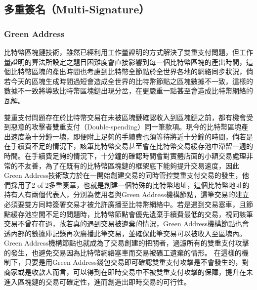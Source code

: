 		\subsection{多重簽名（Multi-Signature）}
		 	\subsubsection{Green Address}
		 	比特幣區塊鏈技術，雖然已經利用工作量證明的方式解決了雙重支付問題，但工作量證明的算法所設定之題目困難度會直接影響到每一個比特幣區塊的產出時間，這個比特幣區塊的產出時間也考慮到比特幣全節點於全世界各地的網絡同步狀況，倘若今天的區塊生成時間過短會造成全世界的比特幣節點之區塊數據不一致，這樣的數據不一致將導致比特幣區塊鏈出現分岔，在更嚴重一點甚至會造成比特幣網絡的瓦解。

		 	雙重支付問題存在於比特幣交易在未被區塊鏈確認收入到區塊鏈之前，都有機會受到惡意的攻擊者雙重支付（Double-spending）\supercite{Informationpropagationinthebitcoinnetwork}同一筆款項。現今的比特幣區塊產出速度為十分鐘一塊，即便附上足夠的手續費也須等待將近十分鐘的時間，倘若是在手續費不足的情況下，該筆比特幣交易甚至會在比特幣交易緩存池中滯留一週的時間。在手續費足夠的情況下，十分鐘的確認時間會對實體店面的小額交易處理非常的不友善，為了在既有的比特幣區塊鏈的框架底下能夠提升交易速度，因此Green Address技術致力於在一開始創建交易的同時管控雙重支付交易的發生，他們採用了2-of-2多重簽章，也就是創建一個特殊的比特幣地址，這個比特幣地址的持有人有兩個代表人，分別為使用者與Green Address機構節點，這筆交易的建立必須要雙方同時簽署交易才被允許廣播至比特幣網絡中。若是遇到交易塞車，且節點緩存池空間不足的問題時，比特幣節點會優先遺棄手續費最低的交易，視同該筆交易不曾存在過，故若真的遇到交易被遺棄的情況，Green Address機構節點也會透內部的數據庫記錄再次廣播此筆交易，並確保此筆交易可以被收入至區塊內。Green Address機構節點也就成為了交易創建的把關者，過濾所有的雙重支付攻擊的發生，也避免交易因為比特幣網絡塞車而交易被礦工遺棄的情形。
		 	在這樣的機制下，只要是用Green Address錢包交易即可確認雙重支付攻擊是不會發生的，對商家或是收款人而言，可以得到在即時交易中不被雙重支付攻擊的保障，提升在未進入區塊鏈的交易可確定性，進而創造出即時交易的可行性。

